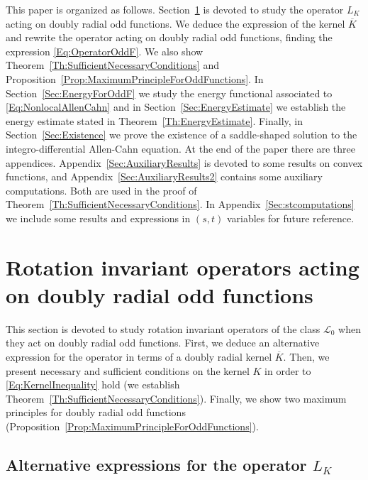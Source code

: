 \documentclass[12pt,reqno]{amsart}
\theoremstyle{definition}
\theoremstyle{remark}
\newcommand{\lcal}{\mathcal{L}}
\numberwithin{equation}{section}
\begin{document}
	This paper is organized as follows. Section~\ref{Sec:OperatorOddF} is devoted to study the operator $L_K$ acting on doubly radial odd functions. We deduce the expression of the kernel $\overline{K}$ and rewrite the operator acting on doubly radial odd functions, finding the expression \eqref{Eq:OperatorOddF}. We also show Theorem~\ref{Th:SufficientNecessaryConditions} and Proposition~\ref{Prop:MaximumPrincipleForOddFunctions}. In Section~\ref{Sec:EnergyForOddF} we study the energy functional associated to \eqref{Eq:NonlocalAllenCahn} and in Section~\ref{Sec:EnergyEstimate} we establish the energy estimate stated in Theorem~\ref{Th:EnergyEstimate}. Finally, in Section~\ref{Sec:Existence} we prove the existence of a saddle-shaped solution to the integro-differential Allen-Cahn equation. At the end of the paper there are three appendices. Appendix~\ref{Sec:AuxiliaryResults} is devoted to some results on convex functions, and Appendix~\ref{Sec:AuxiliaryResults2} contains some auxiliary computations. Both are used in the proof of Theorem~\ref{Th:SufficientNecessaryConditions}. In Appendix~\ref{Sec:stcomputations} we include some results and expressions in $(s,t)$ variables for future reference.
	
	
	
	\section{Rotation invariant operators acting on doubly radial odd functions}
	\label{Sec:OperatorOddF}
	
	This section is devoted to study rotation invariant operators of the class $\lcal_0$ when they act on doubly radial odd functions. First, we deduce an alternative expression for the operator in terms of a doubly radial kernel $\overline{K}$. Then, we present necessary and sufficient conditions on the kernel $K$ in order to \eqref{Eq:KernelInequality} hold (we establish Theorem~\ref{Th:SufficientNecessaryConditions}). Finally, we show two maximum principles for doubly radial odd functions (Proposition~\ref{Prop:MaximumPrincipleForOddFunctions}).
	
	
	\subsection{Alternative expressions for the operator $L_K$}
	
\end{document}
